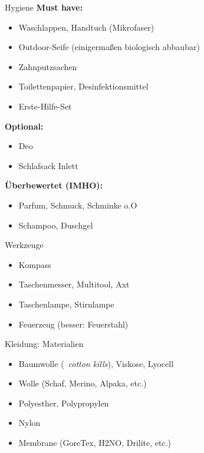 \documentclass{beamer}
\begin{document}
			\begin{frame}{Hygiene}
				\textbf{Must have:}
				\begin{itemize}
					\item Waschlappen, Handtuch (Mikrofaser)
					\item Outdoor-Seife (einigermaßen biologisch abbaubar)
					\item Zahnputzsachen
					\item Toilettenpapier, Desinfektionsmittel
					\item Erste-Hilfe-Set
				\end{itemize}\pause
				\textbf{Optional:}
				\begin{itemize}
					\item Deo
					\item Schlafsack Inlett
				\end{itemize}\pause
				\textbf{Überbewertet (IMHO):}
				\begin{itemize}
					\item Parfum, Schmuck, Schminke o.O
					\item Schampoo, Duschgel
				\end{itemize}
			\end{frame}
			
			\begin{frame}{Werkzeuge}
				\begin{itemize}
					\item Kompass
					\item Taschenmesser, Multitool, Axt
					\item Taschenlampe, Stirnlampe
					\item Feuerzeug (besser: Feuerstahl)
				\end{itemize}
			\end{frame}
			
			\begin{frame}{Kleidung: Materialien}
				\begin{itemize}
					\item Baumwolle (\textrightarrow\ \textit{cotton kills}), Viskose, Lyocell
					\item Wolle (Schaf, Merino, Alpaka, etc.)
					\item Polyesther, Polypropylen
					\item Nylon
					\item Membrane (GoreTex, H2NO, Drilite, etc.)
				\end{itemize}
			\end{frame}
			
\end{document}
